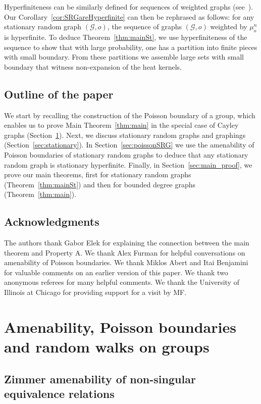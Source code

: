 \documentclass[AHL,Unicode,longabstracts,published]{cedram}
\newcommand{\calG}{\mathcal{G}}
\begin{document}
Hyperfiniteness can be similarly defined for sequences of weighted graphs (see~\cite{ElekTimar}). Our Corollary~\ref{cor:SRGareHyperfinite} can then be rephrased as follows: for any stationary random graph $(\calG,o)$, the sequence of graphs $(\calG,o)$ weighted by $\mu_o^n$ is hyperfinite. To deduce Theorem~\ref{thm:mainSt}, we use hyperfiniteness of the sequence to show that with large probability, one has a partition into finite pieces with small boundary. From these partitions we assemble large sets with small boundary that witness non-expansion of the heat kernels.

\subsection{Outline of the paper}

We start by recalling the construction of the Poisson boundary of a group, which enables us to prove Main Theorem~\ref{thm:main} in the special case of Cayley graphs (Section~\ref{sec:poisson}). Next, we discuss stationary random graphs and graphings (Section~\ref{sec:stationary}). In Section~\ref{sec:poissonSRG} we use the amenability of Poisson boundaries of stationary random graphs to deduce that any stationary random graph is stationary hyperfinite. Finally, in Section~\ref{sec:main_proof}, we prove our main theorems, first for stationary random graphs (Theorem~\ref{thm:mainSt}) and then for bounded degree graphs (Theorem~\ref{thm:main}).



\subsection*{Acknowledgments}

The authors thank Gabor Elek for explaining the connection between the main theorem and Property A. We thank Alex Furman for helpful conversations on amenability of Poisson boundaries. We thank Miklos Abert and Itai Benjamini for valuable comments on an earlier version of this paper. We thank two anonymous referees for many helpful comments. We thank the University of Illinois at Chicago for providing support for a visit by MF. 

\section{Amenability, Poisson boundaries and random walks on groups} \label{sec:poisson}

\subsection{Zimmer amenability of non-singular equivalence relations}\label{sec:zimmer-amenability}
\end{document}
